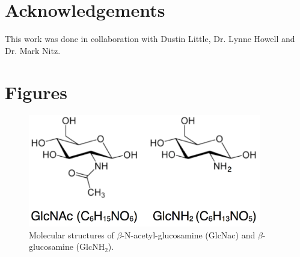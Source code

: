 
\section{Acknowledgements}
This work was done in collaboration with Dustin Little, Dr. Lynne Howell and Dr. Mark Nitz.

\section{Figures}

\begin{figure}[htbp]
\centering
\includegraphics[width=4in]{figures/results4/sugar_structures.pdf}
\caption[Molecular structures of GlcNAc and GlcNH$_2$]{Molecular structures of $\beta$-N-acetyl-glucosamine (GlcNac) and $\beta$-glucosamine (GlcNH$_2$).}
\label{fig:nag}
\end{figure}

